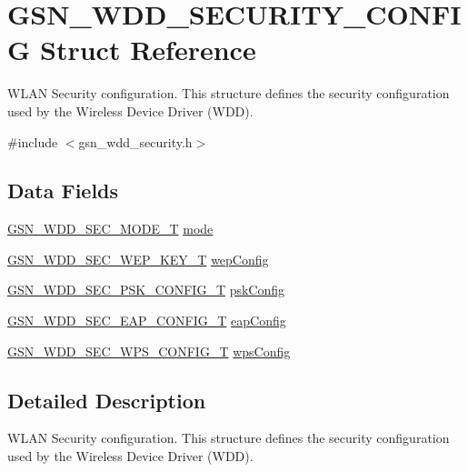 \hypertarget{a00297}{
\section{GSN\_\-WDD\_\-SECURITY\_\-CONFIG Struct Reference}
\label{a00297}
}


WLAN Security configuration. This structure defines the security configuration used by the Wireless Device Driver (WDD).  




{\ttfamily \#include $<$gsn\_\-wdd\_\-security.h$>$}

\subsection*{Data Fields}
\begin{DoxyCompactItemize}
\item 
\hyperlink{a00604_a99d01b68f744000378664161f66e73c9}{GSN\_\-WDD\_\-SEC\_\-MODE\_\-T} \hyperlink{a00297_a07f5ab6b033b5775266d7c9c196897cf}{mode}
\item 
\hyperlink{a00295}{GSN\_\-WDD\_\-SEC\_\-WEP\_\-KEY\_\-T} \hyperlink{a00297_ab32ca0d9b8cddea90b888dc1854fe971}{wepConfig}
\item 
\hyperlink{a00294}{GSN\_\-WDD\_\-SEC\_\-PSK\_\-CONFIG\_\-T} \hyperlink{a00297_a4f7d73999f35d675d76a167ed2ca4afb}{pskConfig}
\item 
\hyperlink{a00287}{GSN\_\-WDD\_\-SEC\_\-EAP\_\-CONFIG\_\-T} \hyperlink{a00297_a99bcdfb3a660b4a529e3bdedc05bc9a1}{eapConfig}
\item 
\hyperlink{a00296}{GSN\_\-WDD\_\-SEC\_\-WPS\_\-CONFIG\_\-T} \hyperlink{a00297_ad2e086a3b4e51ed61f5504c96455732d}{wpsConfig}
\end{DoxyCompactItemize}


\subsection{Detailed Description}
WLAN Security configuration. This structure defines the security configuration used by the Wireless Device Driver (WDD). 


